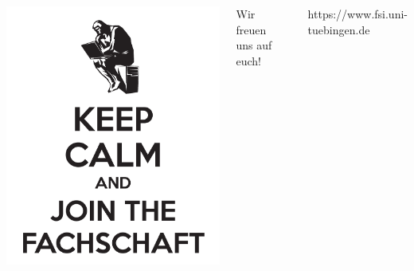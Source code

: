 \documentclass{beamer}
\begin{document}
	\begin{frame}
		\begin{columns}
			\includegraphics[width=\textwidth]{pictures/keepcalm.pdf}
			\centering
			\begin{huge}
				Wir freuen uns auf euch! \vspace*{1cm}
			\end{huge}
			
			\\
			\begin{scriptsize}
				https://www.fsi.uni-tuebingen.de
			\end{scriptsize}
		\end{columns}
		
	\end{frame}
\end{document}
